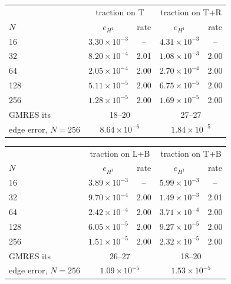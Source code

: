 \begin{tabular}{l cc cc}
\toprule
& \multicolumn{2}{c}{traction on T} & \multicolumn{2}{c}{traction on T+R}\\
$N$ & $e_{H^1}$ & rate & $e_{H^1}$ & rate\\
\midrule
16 & $3.30{\times}10^{-3}$ & -- & $4.31{\times}10^{-3}$ & --\\
32 & $8.20{\times}10^{-4}$ & 2.01 & $1.08{\times}10^{-3}$ & 2.00\\
64 & $2.05{\times}10^{-4}$ & 2.00 & $2.70{\times}10^{-4}$ & 2.00\\
128 & $5.11{\times}10^{-5}$ & 2.00 & $6.75{\times}10^{-5}$ & 2.00\\
256 & $1.28{\times}10^{-5}$ & 2.00 & $1.69{\times}10^{-5}$ & 2.00\\
GMRES its & \multicolumn{2}{c}{18--20} & \multicolumn{2}{c}{27--27}\\
edge error, $N{=}256$ & \multicolumn{2}{c}{$8.64{\times}10^{-6}$} & \multicolumn{2}{c}{$1.84{\times}10^{-5}$}\\
\bottomrule
\end{tabular}

\medskip
\begin{tabular}{l cc cc}
\toprule
& \multicolumn{2}{c}{traction on L+B} & \multicolumn{2}{c}{traction on T+B}\\
$N$ & $e_{H^1}$ & rate & $e_{H^1}$ & rate\\
\midrule
16 & $3.89{\times}10^{-3}$ & -- & $5.99{\times}10^{-3}$ & --\\
32 & $9.70{\times}10^{-4}$ & 2.00 & $1.49{\times}10^{-3}$ & 2.01\\
64 & $2.42{\times}10^{-4}$ & 2.00 & $3.71{\times}10^{-4}$ & 2.00\\
128 & $6.05{\times}10^{-5}$ & 2.00 & $9.27{\times}10^{-5}$ & 2.00\\
256 & $1.51{\times}10^{-5}$ & 2.00 & $2.32{\times}10^{-5}$ & 2.00\\
GMRES its & \multicolumn{2}{c}{26--27} & \multicolumn{2}{c}{18--20}\\
edge error, $N{=}256$ & \multicolumn{2}{c}{$1.09{\times}10^{-5}$} & \multicolumn{2}{c}{$1.53{\times}10^{-5}$}\\
\bottomrule
\end{tabular}
